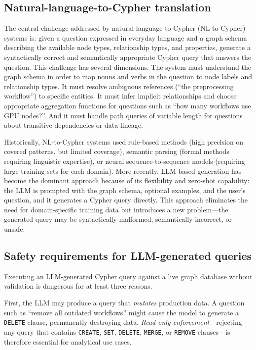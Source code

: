 \documentclass[a4paper]{sapthesis}
\begin{document}
\subsection{Natural-language-to-Cypher translation}

The central challenge addressed by natural-language-to-Cypher
(NL-to-Cypher) systems is: given a question expressed in everyday language
and a graph schema describing the available node types, relationship types,
and properties, generate a syntactically correct and semantically
appropriate Cypher query that answers the question.  This challenge has
several dimensions.  The system must understand the graph schema in order to
map nouns and verbs in the question to node labels and relationship types.
It must resolve ambiguous references (``the preprocessing workflow'') to
specific entities.  It must infer implicit relationships and choose
appropriate aggregation functions for questions such as ``how many
workflows use GPU nodes?''.  And it must handle path queries of variable
length for questions about transitive dependencies or data lineage.

Historically, NL-to-Cypher systems used rule-based methods (high precision
on covered patterns, but limited coverage), semantic parsing (formal
methods requiring linguistic expertise), or neural sequence-to-sequence
models (requiring large training sets for each domain).  More recently,
LLM-based generation has become the dominant approach because of its
flexibility and zero-shot capability: the LLM is prompted with the graph
schema, optional examples, and the user's question, and it generates a
Cypher query directly.  This approach eliminates the need for
domain-specific training data but introduces a new problem---the generated
query may be syntactically malformed, semantically incorrect, or unsafe.

\subsection{Safety requirements for LLM-generated queries}

Executing an LLM-generated Cypher query against a live graph database
without validation is dangerous for at least three reasons.

First, the LLM may produce a query that \emph{mutates} production data.  A
question such as ``remove all outdated workflows'' might cause the model to
generate a \texttt{DELETE} clause, permanently destroying data.
\emph{Read-only enforcement}---rejecting any query that contains
\texttt{CREATE}, \texttt{SET}, \texttt{DELETE}, \texttt{MERGE}, or
\texttt{REMOVE} clauses---is therefore essential for analytical use cases.
\end{document}
